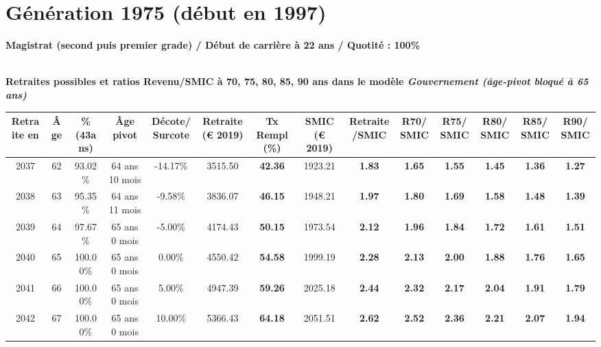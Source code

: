  \newpage 

\section{Génération 1975 (début en 1997)\label{Magistrat_100_22_1975_0}} 
 
{\bf \noindent Magistrat (second puis premier grade) / Début de carrière à 22 ans / Quotité : 100\%}  ~ 

 ~\\{\bf \noindent Retraites possibles et ratios Revenu/SMIC à 70, 75, 80, 85, 90 ans dans le modèle \emph{Gouvernement (âge-pivot bloqué à 65 ans)}}  
 
\begin{adjustbox}{max width=\textwidth} 
\begin{tabular}[htb]{|c|c||c|c|c||c|c||c|c||c|c|c|c|c|} 
\hline 
 Retraite en &  Âge &  \%(43ans) &  Âge pivot &  Décote/Surcote &  Retraite (\euro{} 2019) &  Tx Rempl(\%) &  SMIC (\euro{} 2019) &  Retraite/SMIC &  R70/SMIC &  R75/SMIC &  R80/SMIC &  R85/SMIC &  R90/SMIC \\ 
\hline \hline 
 2037 &  62 &  93.02\% &  64 ans 10 mois &  -14.17\% &  3515.50 &  {\bf 42.36} &  1923.21 &  {\bf 1.83} &  {\bf 1.65} &  {\bf 1.55} &  {\bf 1.45} &  {\bf 1.36} &  {\bf 1.27} \\ 
\hline 
 2038 &  63 &  95.35\% &  64 ans 11 mois &  -9.58\% &  3836.07 &  {\bf 46.15} &  1948.21 &  {\bf 1.97} &  {\bf 1.80} &  {\bf 1.69} &  {\bf 1.58} &  {\bf 1.48} &  {\bf 1.39} \\ 
\hline 
 2039 &  64 &  97.67\% &  65 ans 0 mois &  -5.00\% &  4174.43 &  {\bf 50.15} &  1973.54 &  {\bf 2.12} &  {\bf 1.96} &  {\bf 1.84} &  {\bf 1.72} &  {\bf 1.61} &  {\bf 1.51} \\ 
\hline 
 2040 &  65 &  100.00\% &  65 ans 0 mois &  0.00\% &  4550.42 &  {\bf 54.58} &  1999.19 &  {\bf 2.28} &  {\bf 2.13} &  {\bf 2.00} &  {\bf 1.88} &  {\bf 1.76} &  {\bf 1.65} \\ 
\hline 
 2041 &  66 &  100.00\% &  65 ans 0 mois &  5.00\% &  4947.39 &  {\bf 59.26} &  2025.18 &  {\bf 2.44} &  {\bf 2.32} &  {\bf 2.17} &  {\bf 2.04} &  {\bf 1.91} &  {\bf 1.79} \\ 
\hline 
 2042 &  67 &  100.00\% &  65 ans 0 mois &  10.00\% &  5366.43 &  {\bf 64.18} &  2051.51 &  {\bf 2.62} &  {\bf 2.52} &  {\bf 2.36} &  {\bf 2.21} &  {\bf 2.07} &  {\bf 1.94} \\ 
\hline 
\hline 
\end{tabular} 
\end{adjustbox} 
 
